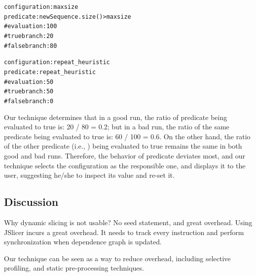 \begin{CodeOut}
\begin{alltt}
configuration: maxsize 
predicate: newSequence.size() > maxsize
    \# evaluation: 100
    \# true branch: 20
    \# false branch: 80

configuration: repeat_heuristic
predicate: repeat_heuristic
    \# evaluation: 50
    \# true branch: 50
    \# false branch: 0
\end{alltt}
\end{CodeOut}

Our technique determines that in a good run, the ratio of predicate 
 being evaluated to true is: 20 / 80 = 0.2;
but in a bad run, the ratio of the same predicate being evaluated to true is: 60 / 100 = 0.6.
On the other hand, the ratio of the other predicate (i.e., ) being evaluated to true
remains the same in both good and bad runs. Therefore, the behavior
of predicate  deviates most, and our technique
selects the  configuration as the responsible one, and displays it to the user, suggesting he/she
to inspect its value and re-set it.

\subsection{Discussion}
Why dynamic slicing is not usable? No seed statement, and great overhead. Using JSlicer incurs
a great overhead. It needs to track every instruction and
perform synchronization when dependence graph is updated.

Our technique can be seen as a way to reduce overhead,
including selective profiling, and static pre-processing
techniques.
